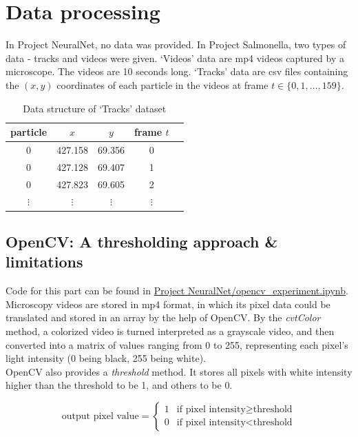\documentclass[11pt,a4paper]{scrartcl}
\begin{document}
\section{Data processing}

In Project NeuralNet, no data was provided. In Project Salmonella, two types of data - tracks and videos were given. `Videos' data are mp4 videos captured by a microscope. The videos are 10 seconds long. `Tracks' data are csv files containing the $(x,y)$ coordinates of each particle in the videos at frame $t \in \{0,1,\dots, 159\}$.

\begin{table}[htbp]
\centering
\begin{tabular}{ccccc}
\toprule
\multicolumn{1}{c}{particle} & \multicolumn{1}{c}{$x$} & \multicolumn{1}{c}{$y$}	& \multicolumn{1}{c}{frame $t$} \\
\midrule
0 & 427.158 & 69.356 & 0 \\
0 & 427.128 & 69.407 & 1 \\
0 & 427.823 & 69.605 & 2 \\
$\vdots$ & $\vdots$ & $\vdots$ & $\vdots$ \\
\bottomrule
\end{tabular}
\caption{Data structure of `Tracks' dataset}
\end{table}


\subsection{OpenCV: A thresholding approach \& limitations}
Code for this part can be found in \url{Project NeuralNet/opencv_experiment.ipynb}.\\

Microscopy videos are stored in mp4 format, in which its pixel data could be translated and stored in an array by the help of OpenCV. By the \textit{cvtColor} method, a colorized video is turned interpreted as a grayscale video, and then converted into a matrix of values ranging from 0 to 255, representing each pixel's light intensity (0 being black, 255 being white). \\

OpenCV also provides a \textit{threshold} method. It stores all pixels with white intensity higher than the threshold to be 1, and others to be 0. 

$$\text{output pixel value} = \begin{cases}
    1 & \text{if pixel intensity} \geq \text{threshold}\\  
    0 & \text{if pixel intensity} < \text{threshold}
\end{cases}$$
\end{document}
